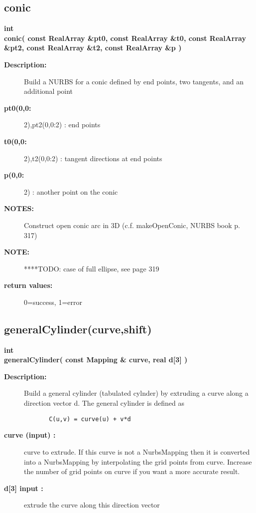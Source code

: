 \subsection{conic}
 
\begin{flushleft} \textbf{%
int  \\ 
\settowidth{\NurbsMappingIncludeArgIndent}{conic(}%
conic( const RealArray \&pt0, const RealArray \&t0, const RealArray \&pt2, const RealArray \&t2, const RealArray \&p )
}\end{flushleft}
\begin{description}
\item[{\bf Description:}] 
 Build a NURBS for a conic defined by end points, two tangents, and an additional point
\item[{\bf pt0(0,0:}] 2),pt2(0,0:2) : end points
\item[{\bf t0(0,0:}] 2),t2(0,0:2) : tangent directions at end points
\item[{\bf p(0,0:}] 2) : another point on the conic

\item[{\bf NOTES:}]  Construct open conic arc in 3D (c.f. makeOpenConic, NURBS book p. 317)

\item[{\bf NOTE:}]  ****TODO: case of full ellipse, see page 319

\item[{\bf return values:}]  0=success, 1=error

\end{description}
\subsection{generalCylinder(curve,shift)}
 
\begin{flushleft} \textbf{%
int  \\ 
\settowidth{\NurbsMappingIncludeArgIndent}{generalCylinder(}%
generalCylinder( const Mapping \& curve, real d[3] )
}\end{flushleft}
\begin{description}
\item[{\bf Description:}] 
    Build a general cylinder (tabulated cylnder) by extruding a curve along a direction vector d.
    The general cylinder is defined as
 \begin{verbatim}
       C(u,v) = curve(u) + v*d
 \end{verbatim}

\item[{\bf curve (input) :}]  curve to extrude. If this curve is not a NurbsMapping then it is converted into
   a NurbsMapping by interpolating the grid points from curve. Increase the number of grid points
      on curve if you want a more accurate result.
\item[{\bf d[3] input :}]  extrude the curve along this direction vector 
\end{description}
